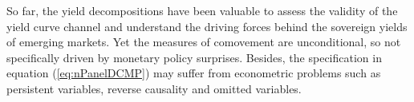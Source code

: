 {So far, the yield decompositions have been valuable to assess the validity of the yield curve channel and understand the driving forces behind the sovereign yields of emerging markets.
Yet the measures of comovement are unconditional, so not specifically driven by monetary policy surprises.
Besides, the specification in equation (\ref{eq:nPanelDCMP}) may suffer from econometric problems such as persistent variables, reverse causality and omitted variables.


%



}
